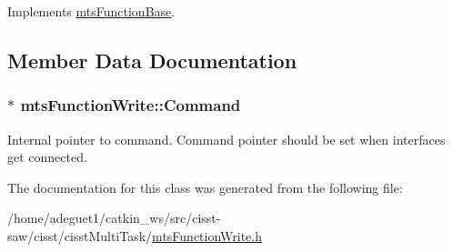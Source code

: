 Implements \hyperlink{classmts_function_base_ae6e5497be34d5563f2df3cb24d68e959}{mts\-Function\-Base}.



\subsection{Member Data Documentation}
\hypertarget{classmts_function_write_ac457eca9ee4e0f8bfc4b2c8a9b3a7927}{
\subsubsection[{Command}]{$\ast$ mts\-Function\-Write\-::\-Command\hspace{0.3cm}{\ttfamily [protected]}}}\label{classmts_function_write_ac457eca9ee4e0f8bfc4b2c8a9b3a7927}
Internal pointer to command. Command pointer should be set when interfaces get connected. 

The documentation for this class was generated from the following file\-:\begin{DoxyCompactItemize}
\item 
/home/adeguet1/catkin\-\_\-ws/src/cisst-\/saw/cisst/cisst\-Multi\-Task/\hyperlink{mts_function_write_8h}{mts\-Function\-Write.\-h}\end{DoxyCompactItemize}
